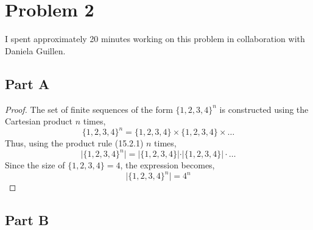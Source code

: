 \documentclass{article}
\begin{document}
\break

\section*{Problem 2}

I spent approximately 20 minutes working on this problem in collaboration with
Daniela Guillen.

\subsection*{Part A}

\begin{proof}

  The set of finite sequences of the form $\{1, 2, 3, 4\}^n$ is constructed
  using the Cartesian product $n$ times,
  $$ \{1, 2, 3, 4\}^n = \{1, 2, 3, 4\} \times \{1, 2, 3, 4\} \times \ldots $$
  Thus, using the product rule (15.2.1) $n$ times,
  $$ \vert \{1, 2, 3, 4\}^n \vert = \vert \{1, 2, 3, 4\} \vert \cdot \vert \{1,
  2, 3, 4\} \vert \cdot \ldots $$
  Since the size of $\{1, 2, 3, 4\} = 4$, the expression becomes,
  $$ \vert \{1, 2, 3, 4\}^n \vert = 4^n $$

\end{proof}

\break

\subsection*{Part B}
\end{document}

